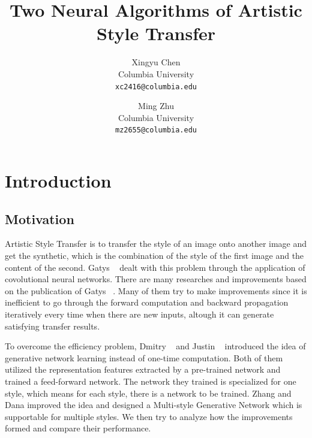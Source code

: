 \documentclass[10pt,twocolumn,letterpaper]{article}
\begin{document}
\title{Two Neural Algorithms of Artistic Style Transfer}

\author{Xingyu Chen\\
Columbia University\\
{\tt\small xc2416@columbia.edu}
\and
Ming Zhu\\
Columbia University\\
{\tt\small mz2655@columbia.edu}
}


\maketitle


\section{Introduction}

\subsection{Motivation}
Artistic Style Transfer is to transfer the style of an image onto another image and get the synthetic, which is the combination of the style of the first image and the content of the second. Gatys \etal~\cite{Authors01} dealt with this problem through the application of covolutional neural networks. There are many researches and improvements based on the publication of Gatys \etal~\cite{Authors01}. Many of them try to make improvements since it is inefficient to go through the forward computation and backward propagation iteratively every time when there are new inputs, altough it can generate satisfying transfer results. 

To overcome the efficiency problem, Dmitry \etal~\cite{Authors02} and Justin \etal~\cite{Authors03} introduced the idea of generative network learning instead of one-time computation. Both of them utilized the representation features extracted by a pre-trained network and trained a feed-forward network. The network they trained is specialized for one style, which means for each style, there is a network to be trained. Zhang and Dana \cite{Authors04} improved the idea and designed a Multi-style Generative Network which is supportable for multiple styles. We then try to analyze how the improvements formed and compare their performance. 
\end{document}
